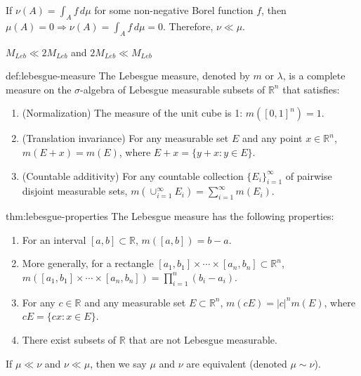             \begin{example}[]{}
            If $\nu(A) = \int_A f \, d\mu$ for some non-negative Borel function $f$, then $\mu(A) = 0 \Rightarrow \nu(A) = \int_A f \, d\mu = 0$. Therefore, $\nu \ll \mu$.
            \end{example}
            \begin{example}{}
                $M_{Leb} \ll 2M_{Leb}$ and $2M_{Leb} \ll M_{Leb}$
                \end{example}
                \begin{definition}{def:lebesgue-measure}
                    The Lebesgue measure, denoted by $m$ or $\lambda$, is a complete measure on the $\sigma$-algebra of Lebesgue measurable subsets of $\mathbb{R}^n$ that satisfies:
                    \begin{enumerate}
                        \item (Normalization) The measure of the unit cube is 1: $m([0,1]^n) = 1$.
                        \item (Translation invariance) For any measurable set $E$ and any point $x \in \mathbb{R}^n$, $m(E+x) = m(E)$, where $E+x = \{y+x : y \in E\}$.
                        \item (Countable additivity) For any countable collection $\{E_i\}_{i=1}^{\infty}$ of pairwise disjoint measurable sets, $m(\cup_{i=1}^{\infty} E_i) = \sum_{i=1}^{\infty} m(E_i)$.
                    \end{enumerate}
                    \end{definition}
                    
                    \begin{theorem}{thm:lebesgue-properties}
                    The Lebesgue measure has the following properties:
                    \begin{enumerate}
                        \item For an interval $[a,b] \subset \mathbb{R}$, $m([a,b]) = b-a$.
                        \item More generally, for a rectangle $[a_1,b_1] \times \cdots \times [a_n,b_n] \subset \mathbb{R}^n$, $m([a_1,b_1] \times \cdots \times [a_n,b_n]) = \prod_{i=1}^{n} (b_i-a_i)$.
                        \item For any $c \in \mathbb{R}$ and any measurable set $E \subset \mathbb{R}^n$, $m(cE) = |c|^n m(E)$, where $cE = \{cx : x \in E\}$.
                        \item There exist subsets of $\mathbb{R}$ that are not Lebesgue measurable.
                    \end{enumerate}
                    \end{theorem}
                \begin{definition}{}
                If $\mu \ll \nu$ and $\nu \ll \mu$, then we say $\mu$ and $\nu$ are equivalent (denoted $\mu \sim \nu$).
                \end{definition}
                
